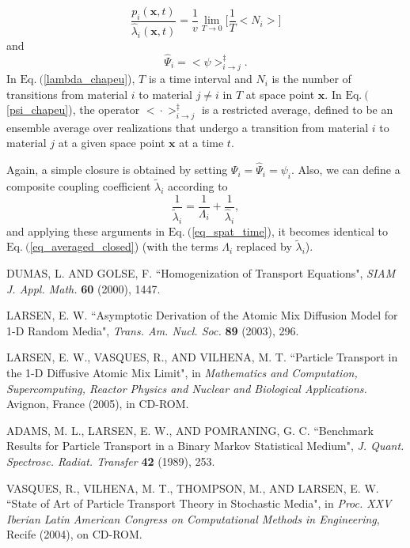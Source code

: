 \documentclass[12pt]{article}
\newcommand{\bl}{\big<}
\newcommand{\bg}{\big>}
\newcommand{\n}{ \noindent}
\begin{document}
\begin{equation}\label{lambda_chapeu}
\frac{p_i(\bm x,t)}{\hat\lambda_i(\bm x,t)}=\frac{1}{v}\lim_{T\rightarrow 0}
\bigg[\frac{1}{T}\bl N_i \bg\bigg]
\end{equation}
\n and
\begin{equation}\label{psi_chapeu}
\hat\Psi_i = \bl \psi \bg^{\ddagger}_{i\rightarrow j}.
\end{equation}
\n In $\textrm{Eq.}\ ($\ref{lambda_chapeu}), $T$ is a time interval and $N_i$ is the number of transitions from material $i$ to material $j\not= i$ in $T$ at space point $\bm x$.
In $\textrm{Eq.}\ ($\ref{psi_chapeu}), the operator $\bl\cdot\bg^{\ddagger}_{i\rightarrow j}$ is a restricted average, defined to be an ensemble average over realizations that undergo a transition from material $i$ to material $j$ at a given space point $\bm x$ at a time $t$.

Again, a simple closure is obtained by setting $\Psi_i = \hat\Psi_i=\psi_i$.
Also, we can define a composite coupling coefficient $\tilde\lambda_i$ according to
\begin{equation}
\frac{1}{\tilde\lambda_i} = \frac{1}{\Lambda_i} + \frac{1}{\hat\lambda_i},
\end{equation}
\n and applying these arguments in $\textrm{Eq.}\ ($\ref{eq_spat_time}), it becomes identical to $\textrm{Eq.}\ ($\ref{eq_averaged_closed}) (with the terms $\Lambda_i$ replaced by $\tilde\lambda_i$). 

 \setlength{\baselineskip}{12pt}
\begin{thebibliography}{300}

 D{\footnotesize UMAS}, L. {\footnotesize AND} G{\footnotesize OLSE}, F.
``Homogenization of Transport Equations",
\textit{SIAM J. Appl. Math.} {\bf 60} (2000), 1447. %

 L{\footnotesize ARSEN}, E. W. ``Asymptotic Derivation of the Atomic Mix Diffusion
Model for 1-D Random Media",
\textit{Trans. Am. Nucl. Soc.} %
{\bf 89} (2003), 296. %

 L{\footnotesize ARSEN}, E. W., V{\footnotesize ASQUES}, R., {\footnotesize AND} V{\footnotesize ILHENA}, M. T. ``Particle Transport in the 1-D Diffusive Atomic Mix Limit", in
\textit{Mathematics and Computation, Supercomputing, Reactor Physics and Nuclear and Biological Applications.} Avignon, France (2005), in CD-ROM.

 A{\footnotesize DAMS}, M. L., L{\footnotesize ARSEN}, E. W.,
{\footnotesize AND}
P{\footnotesize OMRANING}, G. C.
``Benchmark Results for Particle Transport in a Binary Markov Statistical Medium",
\textit{J. Quant. Spectrosc. Radiat. Transfer} {\bf 42} (1989), 253.%
 
  V{\footnotesize ASQUES}, R., V{\footnotesize ILHENA}, M. T.,
T{\footnotesize HOMPSON}, M., {\footnotesize AND} L{\footnotesize ARSEN}, E. W.
``State of Art of Particle Transport Theory in Stochastic Media",
in
\textit{Proc. XXV Iberian Latin American Congress on Computational Methods in Engineering},
Recife (2004), on CD-ROM.%


\end{thebibliography}
\end{document}
